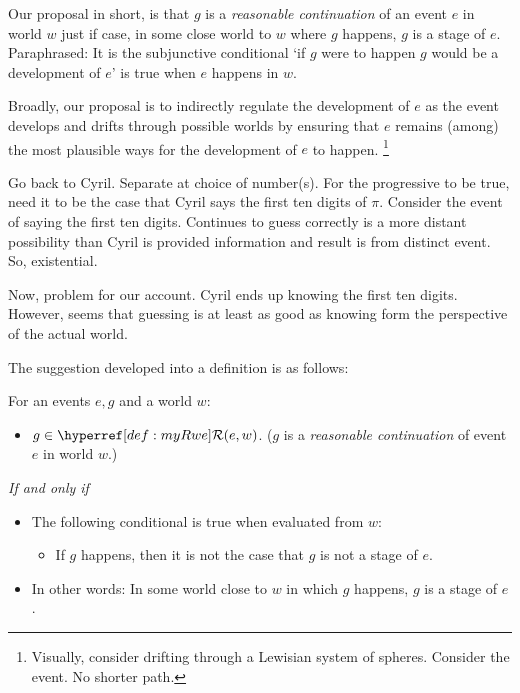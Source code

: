 \begin{note}
  Our proposal in short, is that \(g\) is a \emph{reasonable continuation} of an event \(e\) in world \(w\) just if case, in some close world to \(w\) where \(g\) happens, \(g\) is a stage of \(e\).
  Paraphrased:
  It is the subjunctive conditional `if \(g\) were to happen \(g\) would be a development of \(e\)' is true when \(e\) happens in \(w\).

  Broadly, our proposal is to indirectly regulate the development of \(e\) as the event develops and drifts through possible worlds by ensuring that \(e\) remains (among) the most plausible ways for the development of \(e\) to happen.%
  \footnote{
    Visually, consider drifting through a Lewisian system of spheres.
    Consider the event.
    No shorter path.
  }

  Go back to Cyril.
  Separate at choice of number(s).
  For the progressive to be true, need it to be the case that Cyril says the first ten digits of \(\pi\).
  Consider the event of saying the first ten digits.
  Continues to guess correctly is a more distant possibility than Cyril is provided information and result is from distinct event.
  So, existential.

  Now, problem for our account.
  Cyril ends up knowing the first ten digits.
  However, seems that guessing is at least as good as knowing form the perspective of the actual world.

  The suggestion developed into a definition is as follows:
  \begin{definition}
    \label{def:myRwe}
    For an events \(e,g\) and a world \(w\):
    \begin{itemize}
    \item
      \(g \in \mRwe{w}{e}\). \hfill (\(g\) is a \emph{reasonable continuation} of event \(e\) in world \(w\).)
    \end{itemize}

    \emph{If and only if}

    \begin{itemize}
    \item
      The following conditional is true when evaluated from \(w\):
      \begin{itemize}
      \item
        If \(g\) happens, then it is not the case that \(g\) is not a stage of \(e\).
      \end{itemize}
    \item
      In other words:
      In some world close to \(w\) in which \(g\) happens, \(g\) is a stage of \(e\).
    \end{itemize}
    \vspace{-\baselineskip}
  \end{definition}


\end{note}
